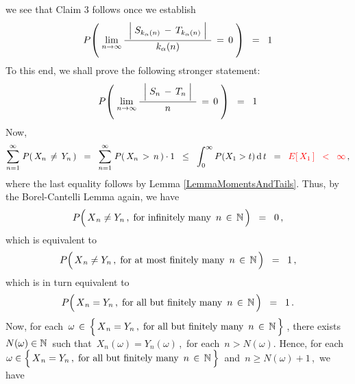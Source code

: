 \begin{enumerate}
we see that Claim 3 follows once we establish
\begin{equation*}
P\!\left(\;
	\underset{n\rightarrow\infty}{\lim}\,
	\dfrac{{\color{white}.}
		\left\vert\;
		S_{k_{\alpha}(n)} \,\overset{{\color{white}.}}{-}\, T_{k_{\alpha}(n)}
		\;\right\vert
		{\color{white}.}}{
		k_{\alpha}(n)
		}
		\,=\, 0
	\;\right)
\;\; = \;\; 1
\end{equation*}
To this end, we shall prove the following stronger statement:
\begin{equation*}
P\!\left(\;
	\underset{n\rightarrow\infty}{\lim}\,
	\dfrac{{\color{white}.}
		\left\vert\;
		S_{n} \,\overset{{\color{white}.}}{-}\, T_{n}
		\;\right\vert
		{\color{white}.}}{
		n
		}
		\,=\, 0
	\;\right)
\;\; = \;\; 1
\end{equation*}
Now,
\begin{equation*}
\overset{\infty}{\underset{n=1}{\sum}}\;P\!\left(\,X_{n} \,\neq\, Y_{n}\,\right)
\;\; = \;\;
	\overset{\infty}{\underset{n=1}{\sum}}\;P\!\left(\,X_{n} \,>\, n\,\right) \cdot 1
\;\; \leq \;\;
	\int_{0}^{\infty}P(X_{1} > t)\,\textnormal{d}\,t
\;\; = \;\;
	{\color{red}E\!\left[\,X_{1}\,\right]
\;\; < \;\;
	\infty}\,,
\end{equation*}
where the last equality follows by Lemma \ref{LemmaMomentsAndTails}.
Thus, by the Borel-Cantelli Lemma again, we have
\begin{equation*}
P\!\left(\,\overset{{\color{white}.}}{X}_{n} \neq Y_{n}\,,\;\textnormal{for infinitely many \,$n\,\in\,\N$}\,\right)
\;\; = \;\; 0\,,
\end{equation*}
which is equivalent to
\begin{equation*}
P\!\left(\,\overset{{\color{white}.}}{X}_{n} \neq Y_{n}\,,\;\textnormal{for at most finitely many \,$n\,\in\,\N$}\,\right)
\;\; = \;\; 1\,,
\end{equation*}
which is in turn equivalent to
\begin{equation*}
P\!\left(\,\overset{{\color{white}.}}{X}_{n} = Y_{n}\,,\;\textnormal{for all but finitely many \,$n\,\in\,\N$}\,\right)
\;\; = \;\; 1\,.
\end{equation*}
Now, for each
\,$\omega \,\in\, \left\{\,\overset{{\color{white}.}}{X}_{n} = Y_{n}\,,\;\textnormal{for all but finitely many \,$n\,\in\,\N$}\,\right\}$\,, there exists \,$N(\omega) \in \mathbb{N}$\, such that \,$X_{n}(\omega) = Y_{n}(\omega)$\,,\, for each \,$n > N(\omega)$.
Hence, for each
\,$\omega \in \left\{\,\overset{{\color{white}.}}{X}_{n} = Y_{n}\,,\;\textnormal{for all but finitely many \,$n\,\in\,\N$}\,\right\}$\,
and \,$n \geq N(\omega)+1$\,,\, we have

\end{enumerate}
